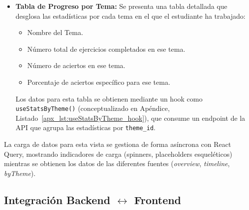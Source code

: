 \begin{itemize}[leftmargin=*]
    \item \textbf{Tabla de Progreso por Tema:} Se presenta una tabla detallada que desglosa las estadísticas por cada tema en el que el estudiante ha trabajado:
        \begin{itemize}
          \item Nombre del Tema.
          \item Número total de ejercicios completados en ese tema.
          \item Número de aciertos en ese tema.
          \item Porcentaje de aciertos específico para ese tema.
        \end{itemize}
        Los datos para esta tabla se obtienen mediante un hook como \texttt{useStatsByTheme()} (conceptualizado en Apéndice, Listado~\ref{apx_lst:useStatsByTheme_hook}), que consume un endpoint de la API que agrupa las estadísticas por \texttt{theme\_id}.
\end{itemize}
La carga de datos para esta vista se gestiona de forma asíncrona con React Query, mostrando indicadores de carga (spinners, placeholders esqueléticos) mientras se obtienen los datos de las diferentes fuentes (\emph{overview}, \emph{timeline}, \emph{byTheme}).

\subsection{Integración Backend \texorpdfstring{\(\leftrightarrow\)}{<->} Frontend}
\label{ssec:desarrollo_iter3_integration}

